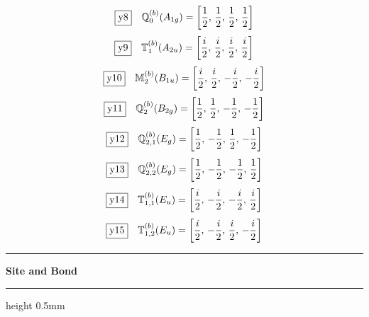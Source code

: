\documentclass[fleqn,10pt,landscape]{jsarticle}
\begin{document}
\begin{dmath*}
\fbox{y8}\quad \mathbb{Q}_{0}^{(b)}(A_{1g})=\left[ \frac{1}{2},\, \frac{1}{2},\, \frac{1}{2},\, \frac{1}{2} \right]
\end{dmath*}
\begin{dmath*}
\fbox{y9}\quad \mathbb{T}_{1}^{(b)}(A_{2u})=\left[ \frac{i}{2},\, \frac{i}{2},\, \frac{i}{2},\, \frac{i}{2} \right]
\end{dmath*}
\begin{dmath*}
\fbox{y10}\quad \mathbb{M}_{2}^{(b)}(B_{1u})=\left[ \frac{i}{2},\, \frac{i}{2},\, - \frac{i}{2},\, - \frac{i}{2} \right]
\end{dmath*}
\begin{dmath*}
\fbox{y11}\quad \mathbb{Q}_{2}^{(b)}(B_{2g})=\left[ \frac{1}{2},\, \frac{1}{2},\, - \frac{1}{2},\, - \frac{1}{2} \right]
\end{dmath*}
\begin{dmath*}
\fbox{y12}\quad \mathbb{Q}_{2,1}^{(b)}(E_{g})=\left[ \frac{1}{2},\, - \frac{1}{2},\, \frac{1}{2},\, - \frac{1}{2} \right]
\end{dmath*}
\begin{dmath*}
\fbox{y13}\quad \mathbb{Q}_{2,2}^{(b)}(E_{g})=\left[ \frac{1}{2},\, - \frac{1}{2},\, - \frac{1}{2},\, \frac{1}{2} \right]
\end{dmath*}
\begin{dmath*}
\fbox{y14}\quad \mathbb{T}_{1,1}^{(b)}(E_{u})=\left[ \frac{i}{2},\, - \frac{i}{2},\, - \frac{i}{2},\, \frac{i}{2} \right]
\end{dmath*}
\begin{dmath*}
\fbox{y15}\quad \mathbb{T}_{1,2}^{(b)}(E_{u})=\left[ \frac{i}{2},\, - \frac{i}{2},\, \frac{i}{2},\, - \frac{i}{2} \right]
\end{dmath*}
\vspace{5mm}
\noindent \rule[0.5mm]{5mm}{0.5mm}\hspace{3mm}\textbf{Site and Bond}\hspace{3mm}\leaders\hrule height 0.5mm\hfill\kern0pt
\vspace{3mm}
\end{document}
